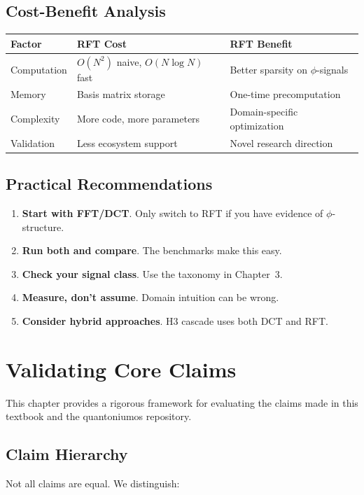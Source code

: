 \documentclass[11pt, a4paper, openany]{book}
\theoremstyle{definition}
\begin{document}
\section{Cost-Benefit Analysis}
\begin{table}[h]
\centering
\begin{tabular}{@{}lll@{}}\toprule
Factor & RFT Cost & RFT Benefit \\ \midrule
Computation & $O(N^2)$ naive, $O(N\log N)$ fast & Better sparsity on $\phi$-signals \\
Memory & Basis matrix storage & One-time precomputation \\
Complexity & More code, more parameters & Domain-specific optimization \\
Validation & Less ecosystem support & Novel research direction \\ \bottomrule
\end{tabular}
\end{table}

\section{Practical Recommendations}
\begin{enumerate}
    \item \textbf{Start with FFT/DCT}. Only switch to RFT if you have evidence of $\phi$-structure.
    \item \textbf{Run both and compare}. The benchmarks make this easy.
    \item \textbf{Check your signal class}. Use the taxonomy in Chapter~3.
    \item \textbf{Measure, don't assume}. Domain intuition can be wrong.
    \item \textbf{Consider hybrid approaches}. H3 cascade uses both DCT and RFT.
\end{enumerate}

\chapter{Validating Core Claims}

This chapter provides a rigorous framework for evaluating the claims made in this textbook and the quantoniumos repository.

\section{Claim Hierarchy}
Not all claims are equal. We distinguish:
\end{document}
